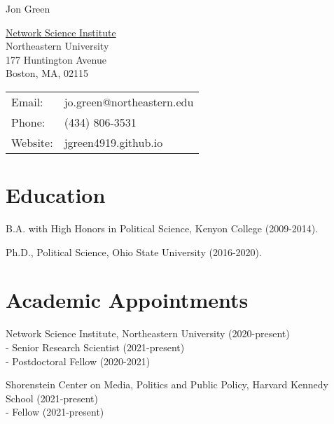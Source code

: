 \documentclass[letterpaper]{article}
\def\name{Jon Green}
\renewenvironment{itemize}{
  \begin{list}{}{
    \setlength{\leftmargin}{1.5em}
  }
}{
  \end{list}
}
\begin{document}
{\huge \name}


\vspace{0.25in}

\begin{minipage}{0.45\linewidth}
  \href{https://www.lazerlab.net/}{Network Science Institute} \\
    Northeastern University \\
    177 Huntington Avenue \\
  Boston, MA, 02115
\end{minipage}
\begin{minipage}{0.45\linewidth}
  \begin{tabular}{ll}
    Email: & jo.green@northeastern.edu \\
    Phone: & (434) 806-3531 \\
    Website: & jgreen4919.github.io \\
  \end{tabular}
\end{minipage}

\section*{Education}

\begin{itemize}
  \item B.A. with High Honors in Political Science, Kenyon College (2009-2014).
  \item Ph.D., Political Science, Ohio State University (2016-2020). 
\end{itemize}

\section*{Academic Appointments}

\begin{itemize}

\item Network Science Institute, Northeastern University (2020-present)\\
- Senior Research Scientist (2021-present)\\
- Postdoctoral Fellow (2020-2021)

\item Shorenstein Center on Media, Politics and Public Policy, Harvard Kennedy School (2021-present)\\
- Fellow (2021-present)
\end{itemize}
\end{document}
